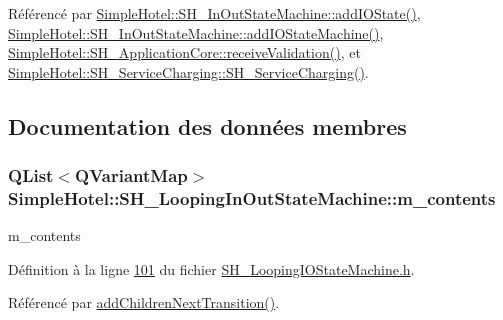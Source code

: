 Référencé par \hyperlink{classSimpleHotel_1_1SH__InOutStateMachine_a07ae9f1f74a9a41b26e77a014679a33e}{Simple\-Hotel\-::\-S\-H\-\_\-\-In\-Out\-State\-Machine\-::add\-I\-O\-State()}, \hyperlink{classSimpleHotel_1_1SH__InOutStateMachine_a27a59a44e0bcddf90d40b38788bb38f4}{Simple\-Hotel\-::\-S\-H\-\_\-\-In\-Out\-State\-Machine\-::add\-I\-O\-State\-Machine()}, \hyperlink{classSimpleHotel_1_1SH__ApplicationCore_ae597b1ac2cc9efb4fe0a61df806bd81a}{Simple\-Hotel\-::\-S\-H\-\_\-\-Application\-Core\-::receive\-Validation()}, et \hyperlink{classSimpleHotel_1_1SH__ServiceCharging_ae82c86c7e955f0dc93cdfc3603789b87}{Simple\-Hotel\-::\-S\-H\-\_\-\-Service\-Charging\-::\-S\-H\-\_\-\-Service\-Charging()}.



\subsection{Documentation des données membres}
\hypertarget{classSimpleHotel_1_1SH__LoopingInOutStateMachine_a46c3dab932ceedeef821a25fa8d6e5dd}{
\subsubsection[{m\-\_\-contents}]{\setlength{\rightskip}{0pt plus 5cm}Q\-List$<$Q\-Variant\-Map$>$ Simple\-Hotel\-::\-S\-H\-\_\-\-Looping\-In\-Out\-State\-Machine\-::m\-\_\-contents\hspace{0.3cm}{\ttfamily [private]}}}\label{classSimpleHotel_1_1SH__LoopingInOutStateMachine_a46c3dab932ceedeef821a25fa8d6e5dd}


m\-\_\-contents 



Définition à la ligne \hyperlink{SH__LoopingIOStateMachine_8h_source_l00101}{101} du fichier \hyperlink{SH__LoopingIOStateMachine_8h_source}{S\-H\-\_\-\-Looping\-I\-O\-State\-Machine.\-h}.



Référencé par \hyperlink{classSimpleHotel_1_1SH__LoopingInOutStateMachine_a2ac2ff43d97fd1b12e1b30d6818f33e4}{add\-Children\-Next\-Transition()}.

